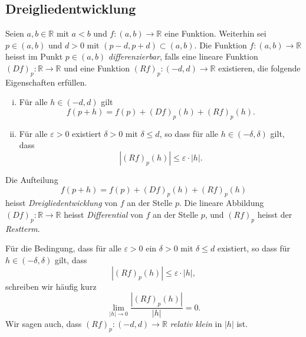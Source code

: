 \documentclass[../main.tex]{subfiles}
\begin{document}
\subsection*{Dreigliedentwicklung}
\begin{definition}
  Seien $a, b \in \mathbb{R}$ 
  mit $a < b$ und
  $f \colon (a, b) \to \mathbb{R}$ 
  eine Funktion.
  Weiterhin sei $p \in (a, b)$ und
  $d > 0$ 
  mit $(p - d, p + d) \subset (a, b)$.
  Die Funktion $f \colon (a, b) \to \mathbb{R}$ 
  heisst im Punkt
  $p \in (a, b)$ \emph{differenzierbar},
  falls eine lineare Funktion
  ${(Df)}_p \colon\mathbb{R} \to \mathbb{R}$
  und eine Funktion ${(Rf)}_p \colon (-d, d) \to \mathbb{R}$ 
  existieren, die folgende Eigenschaften erfüllen.
  \begin{enumerate}[(i)]
    \item Für alle $h \in (-d, d)$ gilt
      \[
        f(p + h) = f(p) + {(Df)}_p(h) + {(Rf)}_p(h).
      \]
    \item Für alle $\varepsilon > 0$ existiert
      $\delta > 0$ mit $\delta \leq d$, so dass
      für alle $h \in (- \delta, \delta)$ gilt,
      dass
      \[
        |{(Rf)}_p(h)| \leq \varepsilon \cdot |h|.
      \]
   \end{enumerate}
   Die Aufteilung
   \[
     f(p + h) = f(p) + {(Df)}_p(h) + {(Rf)}_p(h)
   \]
   heisst \emph{Dreigliedentwicklung} von $f$ 
   an der Stelle $p$.
   Die lineare Abbildung
   ${(Df)}_p \colon\mathbb{R} \to \mathbb{R}$ heisst
   \emph{Differential} von $f$ an der Stelle $p$,
   und ${(Rf)}_p$ heisst der \emph{Restterm}.
\end{definition}

Für die Bedingung, dass für
alle $\varepsilon > 0$ ein $\delta > 0$ 
mit $\delta \leq d$ existiert,
so dass für $h \in (-\delta, \delta)$ gilt,
dass
\[
  |{(Rf)}_p(h)| \leq \varepsilon \cdot |h|,
\]
schreiben wir häufig kurz
\[
  \lim_{|h| \to 0} \frac{|{(Rf)}_p(h)|}{|h|} = 0.
\]
Wir sagen auch, dass ${(Rf)}_p \colon (-d, d) \to \mathbb{R}$ \emph{relativ klein}
in $|h|$ ist.
\end{document}
